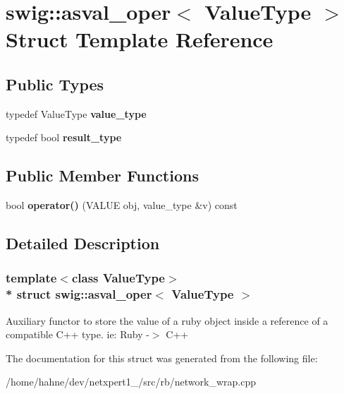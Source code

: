 \hypertarget{structswig_1_1asval__oper}{}\section{swig\+:\+:asval\+\_\+oper$<$ Value\+Type $>$ Struct Template Reference}
\label{structswig_1_1asval__oper}
\subsection*{Public Types}
\begin{DoxyCompactItemize}
\item 
typedef Value\+Type {\bfseries value\+\_\+type}\hypertarget{structswig_1_1asval__oper_a808f7a5c2edd0a72c7c69f99f1237d23}{}\label{structswig_1_1asval__oper_a808f7a5c2edd0a72c7c69f99f1237d23}

\item 
typedef bool {\bfseries result\+\_\+type}\hypertarget{structswig_1_1asval__oper_a8c43ca5e7f6bd359b81c6816c2f4c778}{}\label{structswig_1_1asval__oper_a8c43ca5e7f6bd359b81c6816c2f4c778}

\end{DoxyCompactItemize}
\subsection*{Public Member Functions}
\begin{DoxyCompactItemize}
\item 
bool {\bfseries operator()} (V\+A\+L\+UE obj, value\+\_\+type \&v) const \hypertarget{structswig_1_1asval__oper_a0976b6ff6f9added206e2700b83dc2a4}{}\label{structswig_1_1asval__oper_a0976b6ff6f9added206e2700b83dc2a4}

\end{DoxyCompactItemize}


\subsection{Detailed Description}
\subsubsection*{template$<$class Value\+Type$>$\\*
struct swig\+::asval\+\_\+oper$<$ Value\+Type $>$}

Auxiliary functor to store the value of a ruby object inside a reference of a compatible C++ type. ie\+: Ruby -\/$>$ C++ 

The documentation for this struct was generated from the following file\+:\begin{DoxyCompactItemize}
\item 
/home/hahne/dev/netxpert1\+\_/src/rb/network\+\_\+wrap.\+cpp\end{DoxyCompactItemize}
